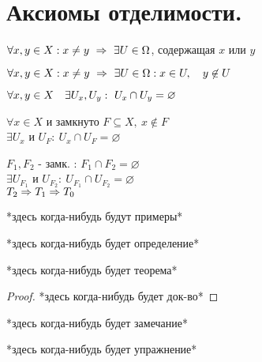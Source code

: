 \documentclass[geometry.tex]{subfiles}
\begin{document}
  \section{Аксиомы отделимости.}

  \begin{theorem} [Колмогорова]
      $\forall x, y \in X: x \neq y \ \Ra \ \exists U \in \Omega$, содержащая $x$ или $y$
  \end{theorem}

  \begin{theorem} [Тихонова]
      $\forall x, y \in X: x \neq y \ \Ra \ \exists U \in \Omega: x \in U,\q y \not \in U$
  \end{theorem}

  \begin{theorem} [Хаусдорфа]
      $\forall x, y \in X \q \exists U_x, U_y: \ U_x \cap U_y = \varnothing$
  \end{theorem}

  \begin{theorem} [3]
      $\forall x \in X$ и замкнуто $F \subseteq X, \  x \not \in F$\\
      $\exists U_x$ и $U_F : \ U_x \cap U_F = \varnothing$
  \end{theorem}

  \begin{theorem} [4]
      $F_1, F_2$ - замк. : $F_1 \cap F_2 = \varnothing$\\
      $\exists U_{F_1}$ и $U_{F_2}: \ U_{F_1} \cap U_{F_2} = \varnothing$\\
      $T_2 \Rightarrow T_1 \Rightarrow T_0$
  \end{theorem}

  \begin{examples}
      *здесь когда-нибудь будут примеры*
  \end{examples}

  \begin{definition}
      *здесь когда-нибудь будет определение*
  \end{definition}

  \begin{theorem}
      *здесь когда-нибудь будет теорема*
  \end{theorem}

  \begin{proof}
      *здесь когда-нибудь будет док-во*
  \end{proof}

  \begin{remark}
      *здесь когда-нибудь будет замечание*
  \end{remark}

  \begin{upr}
      *здесь когда-нибудь будет упражнение*
  \end{upr}
\end{document}

